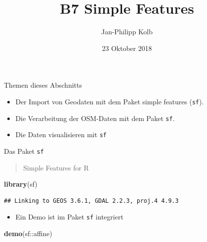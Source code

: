 \documentclass[ignorenonframetext,]{beamer}
\title{B7 Simple Features}
\author{Jan-Philipp Kolb}
\date{23 Oktober 2018}
\newenvironment{Shaded}{\begin{snugshade}}{\end{snugshade}}
\newcommand{\KeywordTok}[1]{\textcolor[rgb]{0.26,0.66,0.93}{\textbf{#1}}}
\newcommand{\NormalTok}[1]{\textcolor[rgb]{0.74,0.68,0.62}{#1}}
\newcommand{\OperatorTok}[1]{\textcolor[rgb]{0.74,0.68,0.62}{#1}}
\providecommand{\tightlist}{%
  \setlength{\itemsep}{0pt}\setlength{\parskip}{0pt}}
\begin{document}
\frame{\titlepage}

\begin{frame}[fragile]{Themen dieses Abschnitts}
\protect\hypertarget{themen-dieses-abschnitts}{}

\begin{itemize}
\tightlist
\item
  Der Import von Geodaten mit dem Paket simple features (\texttt{sf}).
\item
  Die Verarbeitung der OSM-Daten mit dem Paket \texttt{sf}.
\item
  Die Daten visualisieren mit \texttt{sf}
\end{itemize}

\end{frame}

\begin{frame}[fragile]{Das Paket \texttt{sf}}
\protect\hypertarget{das-paket-sf}{}

\begin{quote}
Simple Features for R
\end{quote}

\begin{Shaded}
\begin{Highlighting}[]
\KeywordTok{library}\NormalTok{(sf)}
\end{Highlighting}
\end{Shaded}

\begin{verbatim}
## Linking to GEOS 3.6.1, GDAL 2.2.3, proj.4 4.9.3
\end{verbatim}

\begin{itemize}
\tightlist
\item
  Ein Demo ist im Paket \texttt{sf} integriert
\end{itemize}

\begin{Shaded}
\begin{Highlighting}[]
\KeywordTok{demo}\NormalTok{(sf}\OperatorTok{::}\NormalTok{affine)}
\end{Highlighting}
\end{Shaded}


\end{frame}
\end{document}
